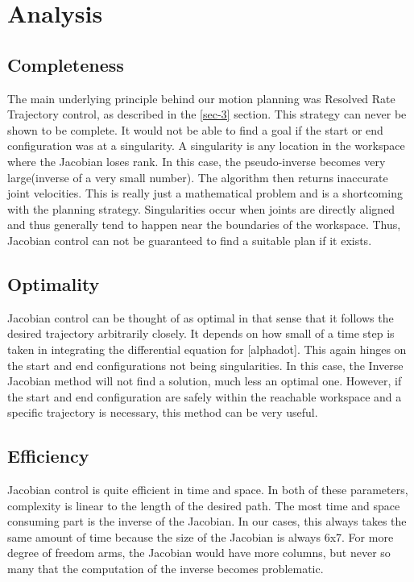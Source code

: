 \documentclass[10pt, conference]{IEEEtran}
\begin{document}
\section{Analysis}
\label{sec-5}
\subsection{Completeness}
\label{sec-5-1}

   The main underlying principle behind our motion planning was
   Resolved Rate Trajectory control, as described in the \ref{sec-3}
   section.  This strategy can never be shown to be complete. It would
   not be able to find a goal if the start or end configuration was at
   a singularity. A singularity is any location in the workspace where
   the Jacobian loses rank. In this case, the pseudo-inverse becomes
   very large(inverse of a very small number). The algorithm then
   returns inaccurate joint velocities. This is really just a
   mathematical problem and is a shortcoming with the planning
   strategy. Singularities occur when joints are directly aligned and
   thus generally tend to happen near the boundaries of the
   workspace. Thus, Jacobian control can not be guaranteed to find a
   suitable plan if it exists.
\subsection{Optimality}
\label{sec-5-2}

   Jacobian control can be thought of as optimal in that sense that it
   follows the desired trajectory arbitrarily closely. It depends on
   how small of a time step is taken in integrating the differential
   equation for [alphadot]. This again hinges on the start and end
   configurations not being singularities. In this case, the Inverse
   Jacobian method will not find a solution, much less an optimal
   one. However, if the start and end configuration are safely within
   the reachable workspace and a specific trajectory is necessary, this
   method can be very useful.
\subsection{Efficiency}
\label{sec-5-3}


   Jacobian control is quite efficient in time and space. In both of
   these parameters, complexity is linear to the length of the desired
   path. The most time and space consuming part is the inverse of the
   Jacobian. In our cases, this always takes the same amount of time
   because the size of the Jacobian is always 6x7. For more degree of
   freedom arms, the Jacobian would have more columns, but never so
   many that the computation of the inverse becomes problematic.
\end{document}
